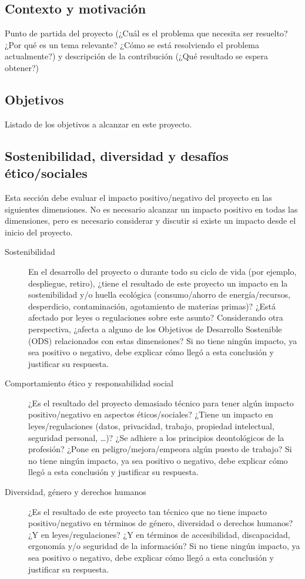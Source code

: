 \documentclass[12pt,a4paper,twoside]{book}
\begin{document}
\subsection{Contexto y motivación}

Punto de partida del proyecto (¿Cuál es el problema que necesita ser resuelto? ¿Por qué es un tema relevante? ¿Cómo se está resolviendo el problema actualmente?) y descripción de la contribución (¿Qué resultado se espera obtener?)

\subsection{Objetivos}

Listado de los objetivos a alcanzar en este proyecto.

\subsection{Sostenibilidad, diversidad y desafíos ético/sociales}

Esta sección debe evaluar el impacto positivo/negativo del proyecto en las siguientes dimensiones. No es necesario alcanzar un impacto positivo en todas las dimensiones, pero es necesario considerar y discutir si existe un impacto desde el inicio del proyecto.

\begin{description}
    \item[Sostenibilidad] En el desarrollo del proyecto o durante todo su ciclo de vida (por ejemplo, despliegue, retiro), ¿tiene el resultado de este proyecto un impacto en la sostenibilidad y/o huella ecológica (consumo/ahorro de energía/recursos, desperdicio, contaminación, agotamiento de materias primas)? ¿Está afectado por leyes o regulaciones sobre este asunto? Considerando otra perspectiva, ¿afecta a alguno de los Objetivos de Desarrollo Sostenible (ODS) relacionados con estas dimensiones? Si no tiene ningún impacto, ya sea positivo o negativo, debe explicar cómo llegó a esta conclusión y justificar su respuesta.
    \item[Comportamiento ético y responsabilidad social] ¿Es el resultado del proyecto demasiado técnico para tener algún impacto positivo/negativo en aspectos éticos/sociales? ¿Tiene un impacto en leyes/regulaciones (datos, privacidad, trabajo, propiedad intelectual, seguridad personal, …)? ¿Se adhiere a los principios deontológicos de la profesión? ¿Pone en peligro/mejora/empeora algún puesto de trabajo? Si no tiene ningún impacto, ya sea positivo o negativo, debe explicar cómo llegó a esta conclusión y justificar su respuesta.
    \item[Diversidad, género y derechos humanos] ¿Es el resultado de este proyecto tan técnico que no tiene impacto positivo/negativo en términos de género, diversidad o derechos humanos? ¿Y en leyes/regulaciones? ¿Y en términos de accesibilidad, discapacidad, ergonomía y/o seguridad de la información? Si no tiene ningún impacto, ya sea positivo o negativo, debe explicar cómo llegó a esta conclusión y justificar su respuesta.
\end{description}
\end{document}
